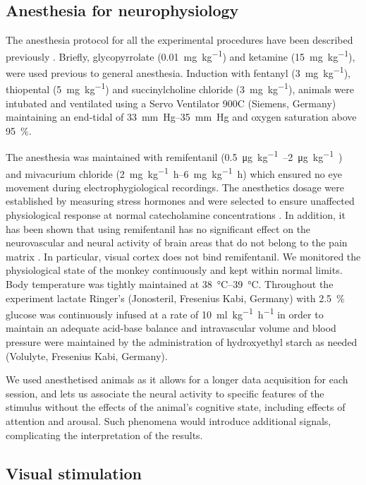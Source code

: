 \subsection{Anesthesia for neurophysiology}

The anesthesia protocol for all the experimental procedures have been described previously \citep{Logothetis1999,Logothetis2001}.
Briefly, glycopyrrolate (\SI{0.01}{mg.{kg}^{-1}}) and ketamine (\SI{15}{mg.{kg}^{-1}}), were used previous to general anesthesia.
Induction with fentanyl (\SI{3}{mg.{kg}^{-1}}), thiopental (\SI{5}{mg.{kg}^{-1}}) and succinylcholine chloride (\SI{3}{mg.{kg}^{-1}}), animals were intubated and ventilated using a Servo Ventilator 900C (Siemens, Germany) maintaining an end-tidal  of \SIrange{33}{35}{mm.Hg} and oxygen saturation above \SI{95}{\percent}.

The anesthesia was maintained with remifentanil (\SIrange{0.5}{2}{\micro\gram.kg^{-1}.\min}) and mivacurium chloride (\SIrange{2}{6}{mg.kg^{-1}.h}) which ensured no eye movement during electrophygiological recordings.
The anesthetics dosage were established by measuring stress hormones and were selected to ensure unaffected physiological response at normal catecholamine concentrations \citep{Logothetis1999}.
In addition, it has been shown that using remifentanil has no significant effect on the neurovascular and neural activity of brain areas that do not belong to the pain matrix \citep{Goense2008,Zappe2008}.
In particular, visual cortex does not bind remifentanil.
We monitored the physiological state of the monkey continuously and kept within normal limits.
Body temperature was tightly maintained at \SIrange{38}{39}{\celsius}.
Throughout the experiment lactate Ringer's (Jonosteril, Fresenius Kabi, Germany) with \SI{2.5}{\percent} glucose was continuously infused at a rate of \SI{10}{ml.kg^{-1}.h^{-1}} in order to maintain an adequate acid-base balance and intravascular volume and blood pressure were maintained by the administration of hydroxyethyl starch as needed (Volulyte, Fresenius Kabi, Germany).

We used anesthetised animals as it allows for a longer data acquisition for each session, and lets us associate the neural activity to specific features of the stimulus without the effects of the animal's cognitive state, including effects of attention and arousal.
Such phenomena would introduce additional signals, complicating the interpretation of the results.


\subsection{Visual stimulation}

